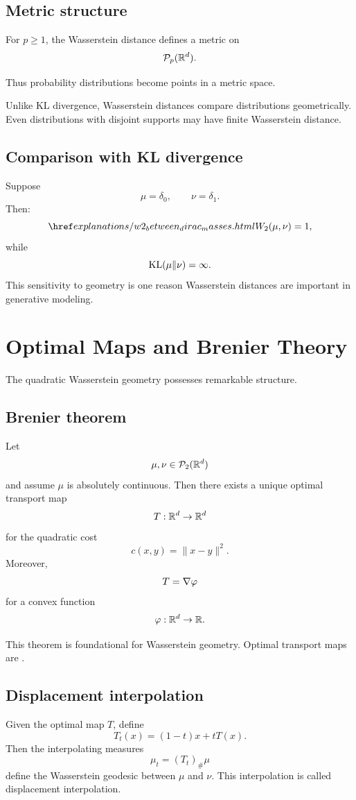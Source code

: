 \subsection{Metric structure}
\begin{theorem}
For $p\ge1$, the Wasserstein distance defines a metric on
\[
\mathcal{P}_p(\mathbb{R}^d).
\]
\end{theorem}
Thus probability distributions become points in a metric space.
\begin{remark}
Unlike KL divergence, Wasserstein distances compare distributions geometrically.
Even distributions with disjoint supports may have finite Wasserstein distance.
\end{remark}
\subsection{Comparison with KL divergence}
Suppose
\[
\mu = \delta_0,
\qquad
\nu = \delta_1.
\]
Then:
\[
\explanationlink{w2_between_dirac_masses}{W_2(\mu,\nu)=1},
\]
while
\[
\mathrm{KL}(\mu\|\nu)=\infty.
\]
This sensitivity to geometry is one reason Wasserstein distances are important in generative modeling.
\section{Optimal Maps and Brenier Theory}
The quadratic Wasserstein geometry possesses remarkable structure.
\subsection{Brenier theorem}
\begin{theorem}[Brenier]
Let
\[
\mu,\nu \in \mathcal{P}_2(\mathbb{R}^d)
\]
and assume $\mu$ is absolutely continuous.
Then there exists a unique optimal transport map
\[
T : \mathbb{R}^d \to \mathbb{R}^d
\]
for the quadratic cost
\[
c(x,y)=\|x-y\|^2.
\]
Moreover,
\[
T = \nabla \varphi
\]
for a convex function
\[
\varphi : \mathbb{R}^d \to \mathbb{R}.
\]
\end{theorem}
\begin{remark}
This theorem is foundational for Wasserstein geometry.
Optimal transport maps are .
\end{remark}
\subsection{Displacement interpolation}
Given the optimal map $T$, define
\[
T_t(x)
=
(1-t)x+tT(x).
\]
Then the interpolating measures
\[
\mu_t = (T_t)_{\#}\mu
\]
define the Wasserstein geodesic between $\mu$ and $\nu$.
This interpolation is called displacement interpolation.
